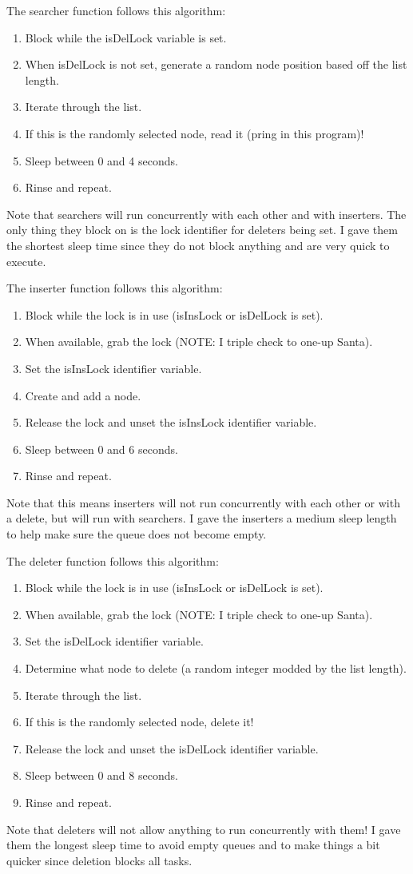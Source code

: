\documentclass[letterpaper,10pt,titlepage]{article}
\begin{document}
The searcher function follows this algorithm:
\begin{enumerate}
	 \item Block while the isDelLock variable is set.
     \item When isDelLock is not set, generate a random node position based off the list length.
    \item Iterate through the list.
    \item If this is the randomly selected node, read it (pring in this program)!
    \item Sleep between 0 and 4 seconds.
    \item Rinse and repeat.
\end{enumerate}
Note that searchers will run concurrently with each other and with inserters.
The only thing they block on is the lock identifier for deleters being set.
I gave them the shortest sleep time since they do not block anything and are very quick to execute.

The inserter function follows this algorithm:
\begin{enumerate}
	\item Block while the lock is in use (isInsLock or isDelLock is set).
    \item When available, grab the lock (NOTE: I triple check to one-up Santa).
    \item Set the isInsLock identifier variable.
    \item Create and add a node.
    \item Release the lock and unset the isInsLock identifier variable.
    \item Sleep between 0 and 6 seconds.
    \item Rinse and repeat.
\end{enumerate}
Note that this means inserters will not run concurrently with each other or with a delete, but will run with searchers.
I gave the inserters a medium sleep length to help make sure the queue does not become empty.

The deleter function follows this algorithm:
\begin{enumerate}
	\item Block while the lock is in use (isInsLock or isDelLock is set).
    \item When available, grab the lock (NOTE: I triple check to one-up Santa).
    \item Set the isDelLock identifier variable.
    \item Determine what node to delete (a random integer modded by the list length).
    \item Iterate through the list.
    \item If this is the randomly selected node, delete it!
    \item Release the lock and unset the isDelLock identifier variable.
    \item Sleep between 0 and 8 seconds.
    \item Rinse and repeat.
\end{enumerate}
Note that deleters will not allow anything to run concurrently with them!
I gave them the longest sleep time to avoid empty queues and to make things a bit quicker since deletion blocks all tasks.
\end{document}

